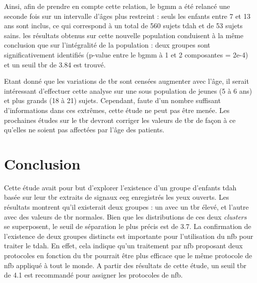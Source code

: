 Ainsi, afin de prendre en compte cette relation, le \gls{bgmm} a été relancé une seconde fois sur un intervalle d'âges plus restreint : seuls les enfants
entre 7 et 13 ans sont inclus, ce qui correspond à un total de 560 sujets \gls{tdah} et de 53 sujets sains. les résultats obtenus sur cette nouvelle population 
conduisent à la même conclusion que sur l'intégralité de la population : deux groupes sont significativement identifiés (p-value entre le \gls{bgmm} à 1 et 2 
composantes = 2e-4) et un seuil \gls{tbr} de 3.84 est trouvé. 

Etant donné que les variations de \gls{tbr} sont censées augmenter avec l'âge, il serait intéressant d'effectuer cette analyse sur une sous population de jeunes (5 
à 6 ans) et plus grands (18 à 21) sujets. Cependant, faute d'un nombre suffisant d'informations dans ces extrêmes, cette étude ne peut pas être menée. Les prochaines
études sur le \gls{tbr} devront corriger les valeurs de \gls{tbr} de façon à ce qu'elles ne soient pas affectées par l'âge des patients.

\section{Conclusion}

Cette étude avait pour but d'explorer l'existence d'un groupe d'enfants \gls{tdah} basée sur leur \gls{tbr} extraits de signaux \gls{eeg} enregistrés les yeux 
ouverts. Les résultats montrent qu'il existerait deux groupes : un avec un \gls{tbr} élevé, et l'autre avec des valeurs de \gls{tbr} normales. Bien que les 
distributions de ces deux \textit{clusters} se superposent, le seuil de séparation le plus précis est de 3.7. La confirmation de l'existence de deux groupes
distincts est importante pour l'utilisation du \gls{nfb} pour traiter le \gls{tdah}. En effet, cela indique qu'un traitement par \gls{nfb} proposant deux protocoles
en fonction du \gls{tbr} pourrait être plus efficace que le même protocole de \gls{nfb} appliqué à tout le monde. A partir des résultats de cette étude, un seuil 
\gls{tbr} de 4.1 est recommandé pour assigner les protocoles de \gls{nfb}.

